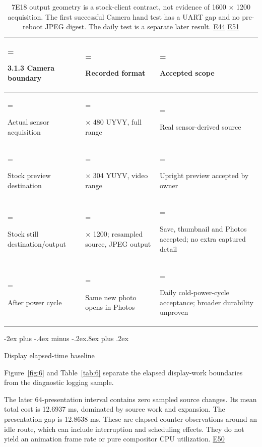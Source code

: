 \documentclass[10pt,letterpaper,twocolumn]{article}
\makeatletter
\renewcommand{\subsection}{\@startsection{subsection}{2}{0pt}
  {-2ex plus -.4ex minus -.2ex}{.8ex plus .2ex}
  {\normalfont\normalsize\bfseries\raggedright}}
\makeatother
\begin{document}
\begin{table}[t]
\centering
\caption[]{7E18 output geometry is a stock-client contract, not evidence of 1600 \(\times\) 1200 acquisition. The first successful Camera hand test has a UART gap and no pre-reboot JPEG digest. The daily test is a separate later result. \hyperlink{e-E44}{\textsf{E44}} \hyperlink{e-E51}{\textsf{E51}}}
\label{tab:5}
\setlength{\tabcolsep}{4pt}\renewcommand{\arraystretch}{1.08}
\begin{tabularx}{\linewidth}{@{}>{\hsize=1\hsize\linewidth=\hsize\raggedright\arraybackslash}X>{\hsize=1\hsize\linewidth=\hsize\raggedright\arraybackslash}X>{\hsize=1\hsize\linewidth=\hsize\raggedright\arraybackslash}X@{}}
\toprule
\textbf{3.1.3 Camera boundary} & \textbf{Recorded format} & \textbf{Accepted scope} \\
\midrule
Actual sensor acquisition & 640 \(\times\) 480 UYVY, full range & Real sensor-derived source \\
Stock preview destination & 400 \(\times\) 304 YUYV, video range & Upright preview accepted by owner \\
Stock still destination/output & 1600 \(\times\) 1200; resampled source, JPEG output & Save, thumbnail and Photos accepted; no extra captured detail \\
After power cycle & Same new photo opens in Photos & Daily cold-power-cycle acceptance; broader durability unproven \\
\bottomrule
\end{tabularx}
\end{table}

\subsection{Display elapsed-time baseline}

Figure~\ref{fig:6} and Table~\ref{tab:6} separate the elapsed display-work boundaries from the diagnostic logging sample.

The later 64-presentation interval contains zero sampled source changes. Its mean total cost is 12.6937 ms, dominated by source work and expansion. The presentation gap is 12.8638 ms. These are elapsed counter observations around an idle route, which can include interruption and scheduling effects. They do not yield an animation frame rate or pure compositor CPU utilization. \hyperlink{e-E50}{\textsf{E50}}
\end{document}
